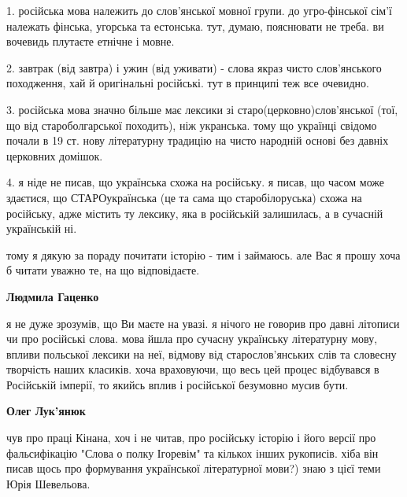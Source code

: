 \begin{itemize}
\begin{itemize}
1. російська мова належить до слов'янської мовної групи. до угро-фінської сім'ї
належать фінська, угорська та естонська. тут, думаю, пояснювати не треба. ви
вочевидь плутаєте етнічне і мовне.

2. завтрак (від завтра) і ужин (від уживати) - слова якраз чисто слов'янського
походження, хай й оригінальні російські. тут в принципі теж все очевидно.

3. російська мова значно більше має лексики зі старо(церковно)слов'янської
(тої, що від староболгарської походить), ніж укранська. тому що українці
свідомо почали в 19 ст. нову літературну традицію на чисто народній основі без
давніх церковних домішок.

4. я ніде не писав, що українська схожа на російську. я писав, що часом може
здаєтися, що СТАРОукраїнська (це та сама що старобілоруська) схожа на
російську, адже містить ту лексику, яка в російській залишилась, а в сучасній
українській ні.

тому я дякую за пораду почитати історію - тим і займаюсь. але Вас я прошу хоча
б читати уважно те, на що відповідаєте.

 
\textbf{Людмила Гаценко} 

я не дуже зрозумів, що Ви маєте на увазі. я нічого не говорив про давні
літописи чи про російські слова. мова йшла про сучасну українську літературну
мову, впливи польської лексики на неї, відмову від старослов'янських слів та
словесну творчість наших класиків. хоча враховуючи, що весь цей процес
відбувався в Російській імперії, то якийсь вплив і російської безумовно мусив
бути.


 
\textbf{Олег Лук'янюк} 

чув про праці Кінана, хоч і не читав, про російську історію і його версії про
фальсифікацію "Слова о полку Ігоревім" та кількох інших рукописів. хіба він
писав щось про формування української літературної мови?) знаю з цієї теми Юрія
Шевельова.


\end{itemize}
\end{itemize}
